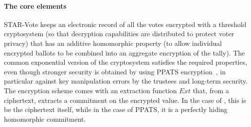 \label{sec:crypto}



\paragraph{The core elements}
\label{sec:crypto-core}


\newcommand{\Ext}{\ensuremath{Ext}\xspace}

STAR-Vote keeps an electronic record of all the votes encrypted with a
threshold cryptosystem (so that decryption capabilities are
distributed to protect voter privacy) that has an additive homomorphic
property (to allow individual encrypted ballots to be combined into an
aggregate encryption of the tally).  The common exponential version of
the \elgamal cryptosystem satisfies the required properties, even
though stronger security is obtained by using PPATS
encryption~\cite{CPP13}, in particular against key manipulation errors
by the trustees and long-term security. The encryption scheme comes
with an extraction function \Ext that, from a ciphertext, extracts a
commitment on the encrypted value. In the case of \elgamal, this is be
the ciphertext itself, while in the case of PPATS, it is a perfectly
hiding homomorphic commitment.


